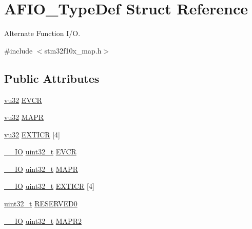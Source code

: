 \hypertarget{struct_a_f_i_o___type_def}{}\section{A\+F\+I\+O\+\_\+\+Type\+Def Struct Reference}
\label{struct_a_f_i_o___type_def}


Alternate Function I/O.  




{\ttfamily \#include $<$stm32f10x\+\_\+map.\+h$>$}

\subsection*{Public Attributes}
\begin{DoxyCompactItemize}
\item 
\hyperlink{agilefox_2library_2inc_2stm32f10x__type_8h_a6e2761f0a1011f84ed96b946f2c8a563}{vu32} \hyperlink{struct_a_f_i_o___type_def_aa7a164e76ffcc803a5e0985a87a2590e}{E\+V\+CR}
\item 
\hyperlink{agilefox_2library_2inc_2stm32f10x__type_8h_a6e2761f0a1011f84ed96b946f2c8a563}{vu32} \hyperlink{struct_a_f_i_o___type_def_a810de55f3ca9e0382a66a5fecc3bf2dd}{M\+A\+PR}
\item 
\hyperlink{agilefox_2library_2inc_2stm32f10x__type_8h_a6e2761f0a1011f84ed96b946f2c8a563}{vu32} \hyperlink{struct_a_f_i_o___type_def_aa4f8d7d5d976a55acbe9544de4300f8d}{E\+X\+T\+I\+CR} \mbox{[}4\mbox{]}
\item 
\hyperlink{group___c_m_s_i_s___c_m3__core__definitions_gaec43007d9998a0a0e01faede4133d6be}{\+\_\+\+\_\+\+IO} \hyperlink{_p_e___types_8h_a33594304e786b158f3fb30289278f5af}{uint32\+\_\+t} \hyperlink{struct_a_f_i_o___type_def_a377d5227cd20950e4489cd04df16500f}{E\+V\+CR}
\item 
\hyperlink{group___c_m_s_i_s___c_m3__core__definitions_gaec43007d9998a0a0e01faede4133d6be}{\+\_\+\+\_\+\+IO} \hyperlink{_p_e___types_8h_a33594304e786b158f3fb30289278f5af}{uint32\+\_\+t} \hyperlink{struct_a_f_i_o___type_def_a2b44ba1a427df7d8c0b254f869b9b463}{M\+A\+PR}
\item 
\hyperlink{group___c_m_s_i_s___c_m3__core__definitions_gaec43007d9998a0a0e01faede4133d6be}{\+\_\+\+\_\+\+IO} \hyperlink{_p_e___types_8h_a33594304e786b158f3fb30289278f5af}{uint32\+\_\+t} \hyperlink{struct_a_f_i_o___type_def_a5f590aa12271be60c2f61b0a6d2b8772}{E\+X\+T\+I\+CR} \mbox{[}4\mbox{]}
\item 
\hyperlink{_p_e___types_8h_a33594304e786b158f3fb30289278f5af}{uint32\+\_\+t} \hyperlink{struct_a_f_i_o___type_def_a6cf52816787797115664f0c8167a92b9}{R\+E\+S\+E\+R\+V\+E\+D0}
\item 
\hyperlink{group___c_m_s_i_s___c_m3__core__definitions_gaec43007d9998a0a0e01faede4133d6be}{\+\_\+\+\_\+\+IO} \hyperlink{_p_e___types_8h_a33594304e786b158f3fb30289278f5af}{uint32\+\_\+t} \hyperlink{struct_a_f_i_o___type_def_a4420b9fe25158ac2e5e32f6ad9d1b6ca}{M\+A\+P\+R2}
\end{DoxyCompactItemize}


